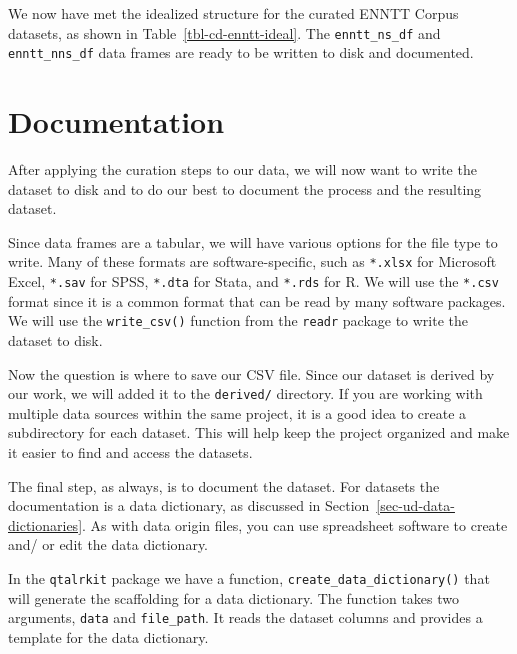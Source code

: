 \documentclass[
  letterpaper,
]{latex/krantz}
\theoremstyle{definition}
\theoremstyle{remark}
\begin{document}
We now have met the idealized structure for the curated ENNTT Corpus
datasets, as shown in Table~\ref{tbl-cd-enntt-ideal}. The
\texttt{enntt\_ns\_df} and \texttt{enntt\_nns\_df} data frames are ready
to be written to disk and documented.

\section{Documentation}\label{documentation}

After applying the curation steps to our data, we will now want to write
the dataset to disk and to do our best to document the process and the
resulting dataset.

Since data frames are a tabular, we will have various options for the
file type to write. Many of these formats are software-specific, such as
\texttt{*.xlsx} for Microsoft Excel, \texttt{*.sav} for SPSS,
\texttt{*.dta} for Stata, and \texttt{*.rds} for R. We will use the
\texttt{*.csv} format since it is a common format that can be read by
many software packages. We will use the \texttt{write\_csv()} function
from the \texttt{readr} package to write the dataset to disk.

Now the question is where to save our CSV file. Since our dataset is
derived by our work, we will added it to the \texttt{derived/}
directory. If you are working with multiple data sources within the same
project, it is a good idea to create a subdirectory for each dataset.
This will help keep the project organized and make it easier to find and
access the datasets.

The final step, as always, is to document the dataset. For datasets the
documentation is a data dictionary, as discussed in
Section~\ref{sec-ud-data-dictionaries}. As with data origin files, you
can use spreadsheet software to create and/ or edit the data dictionary.

In the \texttt{qtalrkit} package we have a function,
\texttt{create\_data\_dictionary()} that will generate the scaffolding
for a data dictionary. The function takes two arguments, \texttt{data}
and \texttt{file\_path}. It reads the dataset columns and provides a
template for the data dictionary.
\end{document}

